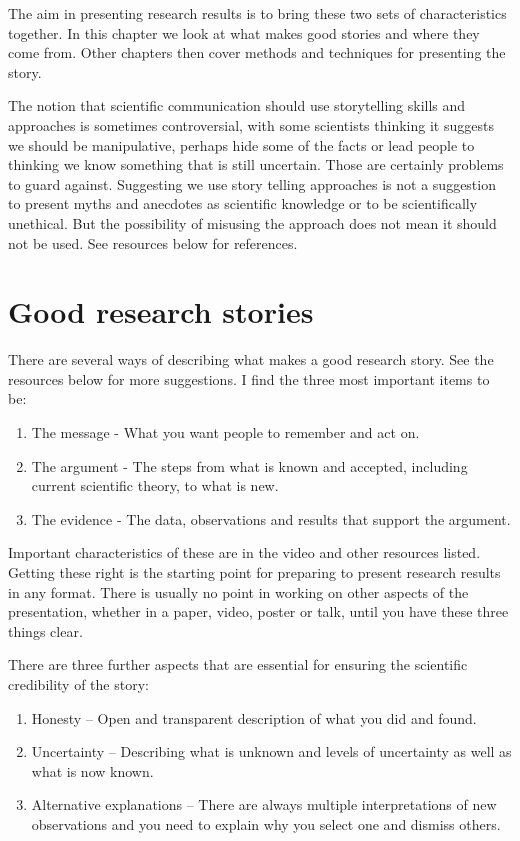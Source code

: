 \documentclass[
  titlepage]{book}
\begin{document}
The aim in presenting research results is to bring these two sets of characteristics together. In this chapter we look at what makes good stories and where they come from. Other chapters then cover methods and techniques for presenting the story.

The notion that scientific communication should use storytelling skills and approaches is sometimes controversial, with some scientists thinking it suggests we should be manipulative, perhaps hide some of the facts or lead people to thinking we know something that is still uncertain. Those are certainly problems to guard against. Suggesting we use story telling approaches is not a suggestion to present myths and anecdotes as scientific knowledge or to be scientifically unethical. But the possibility of misusing the approach does not mean it should not be used. See resources below for references.

\hypertarget{good-research-stories}{%
\section{Good research stories}\label{good-research-stories}}

There are several ways of describing what makes a good research story. See the resources below for more suggestions. I find the three most important items to be:

\begin{enumerate}
\def\labelenumi{\arabic{enumi}.}
\item
  The message - What you want people to remember and act on.
\item
  The argument - The steps from what is known and accepted, including current scientific theory, to what is new.
\item
  The evidence - The data, observations and results that support the argument.
\end{enumerate}

Important characteristics of these are in the video and other resources listed. Getting these right is the starting point for preparing to present research results in any format. There is usually no point in working on other aspects of the presentation, whether in a paper, video, poster or talk, until you have these three things clear.

There are three further aspects that are essential for ensuring the scientific credibility of the story:

\begin{enumerate}
\def\labelenumi{\arabic{enumi}.}
\setcounter{enumi}{3}
\item
  Honesty -- Open and transparent description of what you did and found.
\item
  Uncertainty -- Describing what is unknown and levels of uncertainty as well as what is now known.
\item
  Alternative explanations -- There are always multiple interpretations of new observations and you need to explain why you select one and dismiss others.
\end{enumerate}
\end{document}
